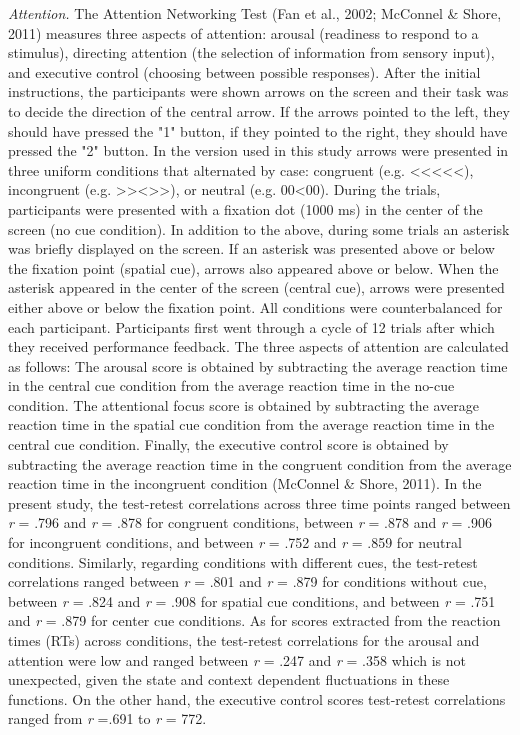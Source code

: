 \documentclass[authordate, empirical]{jote-new-article}
\begin{document}
\emph{Attention. }The\emph{ }Attention Networking Test\textbf{ }(Fan et al., 2002; McConnel \& Shore, 2011) measures three aspects of attention: arousal (readiness to respond to a stimulus), directing attention (the selection of information from sensory input), and executive control (choosing between possible responses). After the initial instructions, the participants were shown arrows on the screen and their task was to decide the direction of the central arrow. If the arrows pointed to the left, they should have pressed the "1" button, if they pointed to the right, they should have pressed the "2" button. In the version used in this study arrows were presented in three uniform conditions that alternated by case: congruent (e.g. <<<<<), incongruent (e.g. >><>>), or neutral (e.g. 00<00). During the trials, participants were presented with a fixation dot (1000 ms) in the center of the screen (no cue condition). In addition to the above, during some trials an asterisk was briefly displayed on the screen. If an asterisk was presented above or below the fixation point (spatial cue), arrows also appeared above or below. When the asterisk appeared in the center of the screen (central cue), arrows were presented either above or below the fixation point. All conditions were counterbalanced for each participant. Participants first went through a cycle of 12 trials after which they received performance feedback. The three aspects of attention are calculated as follows: The arousal score is obtained by subtracting the average reaction time in the central cue condition from the average reaction time in the no-cue condition. The attentional focus score is obtained by subtracting the average reaction time in the spatial cue condition from the average reaction time in the central cue condition. Finally, the executive control score is obtained by subtracting the average reaction time in the congruent condition from the average reaction time in the incongruent condition (McConnel \& Shore, 2011). In the present study, the test-retest correlations across three time points ranged between \emph{r} = .796 and \emph{r} = .878 for congruent conditions, between \emph{r} = .878 and \emph{r} = .906 for incongruent conditions, and between \emph{r} = .752 and \emph{r} = .859 for neutral conditions. Similarly, regarding conditions with different cues, the test-retest correlations ranged between \emph{r} = .801 and \emph{r }= .879 for conditions without cue, between \emph{r} = .824 and \emph{r }= .908 for spatial cue conditions, and between \emph{r} = .751 and \emph{r} = .879 for center cue conditions. As for scores extracted from the reaction times (RTs) across conditions, the test-retest correlations for the arousal and attention were low and ranged between \emph{r} = .247 and \emph{r} = .358 which is not unexpected, given the state and context dependent fluctuations in these functions. On the other hand, the executive control scores test-retest correlations ranged from \emph{r} =.691 to \emph{r} = 772.
\end{document}
